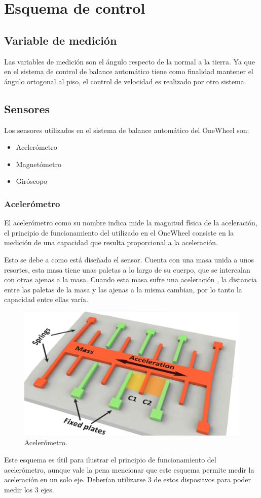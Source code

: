 
\section{Esquema de control}
\subsection{Variable de medici\'on}
Las variables de medición son el ángulo respecto de la normal a la tierra. Ya que en el sistema de control de balance automático tiene como finalidad mantener el ángulo ortogonal al piso, el control de velocidad es realizado por otro sistema.
  
\subsection{Sensores}
Los sensores utilizados en el sistema de balance automático del OneWheel son:
\begin{itemize}
\item Aceler\'ometro
\item Magnetómetro
\item Giróscopo
\end{itemize}
\subsubsection{Aceler\'ometro}
El aceler\'ometro como su nombre indica mide la magnitud f\'isica de la aceleraci\'on, el principio de funcionamiento del utilizado en el OneWheel consiste en la medici\'on de una capacidad que resulta proporcional a la aceleraci\'on.


Esto se debe a como est\'a diseñado el sensor. Cuenta con una masa unida a unos resortes, esta masa tiene unas paletas a lo largo de su cuerpo, que se intercalan con otras ajenas a la masa. Cuando esta masa sufre una aceleraci\'on , la distancia entre las paletas de la masa y las ajenas a la misma cambian, por lo tanto la capacidad entre ellas var\'ia. 
 \begin{figure}[H]
	\center
	\includegraphics[width=0.5\linewidth, page=1]{Imagenes/accelerometer}
	\caption{Aceler\'ometro.}
	\label{fig:Esq_con:acelerometro}
\end{figure}
Este esquema es \'util para ilustrar el principio de funcionamiento del aceler\'ometro, aunque vale la pena mencionar que este esquema permite medir la aceleraci\'on en un solo eje. Deber\'ian utilizarse 3 de estos dispositvos para poder medir los 3 ejes.
